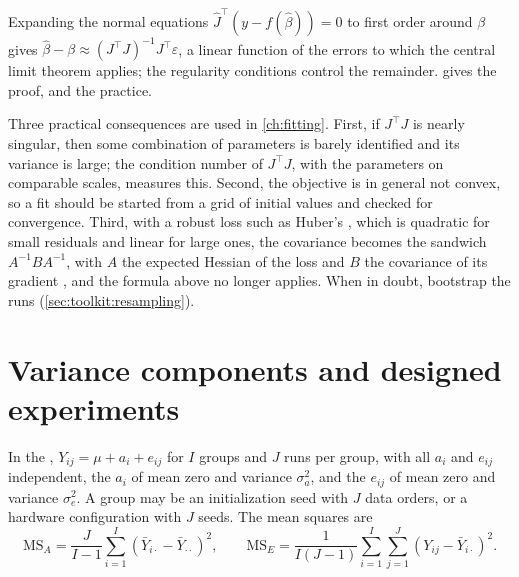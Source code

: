 \begin{refsection}
\begin{proofsketch}
Expanding the normal equations $\hat J^\top(y-f(\hat\beta))=0$ to first order around $\beta$ gives $\hat\beta-\beta\approx(J^\top J)^{-1}J^\top\varepsilon$, a linear function of the errors to which the central limit theorem applies; the regularity conditions control the remainder. \Textcite{Jennrich1969} gives the proof, and \textcite{SeberWild1989} the practice.
\end{proofsketch}

Three practical consequences are used in \cref{ch:fitting}. First, if $J^\top J$ is nearly singular, then some combination of parameters is barely identified and its variance is large; the condition number of $J^\top J$, with the parameters on comparable scales, measures this. Second, the objective is in general not convex, so a fit should be started from a grid of initial values and checked for convergence. Third, with a robust loss such as Huber's \parencite{Huber1964}, which is quadratic for small residuals and linear for large ones, the covariance becomes the sandwich $A^{-1}BA^{-1}$, with $A$ the expected Hessian of the loss and $B$ the covariance of its gradient \parencite[Chapter~5]{vanderVaart1998}, and the formula above no longer applies. When in doubt, bootstrap the runs (\cref{sec:toolkit:resampling}).

\section{Variance components and designed experiments}\label{sec:toolkit:design}

In the , $Y_{ij}=\mu+a_i+e_{ij}$ for $I$ groups and $J$ runs per group, with all $a_i$ and $e_{ij}$ independent, the $a_i$ of mean zero and variance $\sigma_a^2$, and the $e_{ij}$ of mean zero and variance $\sigma_e^2$. A group may be an initialization seed with $J$ data orders, or a hardware configuration with $J$ seeds. The mean squares are
\[
\mathrm{MS}_A=\frac{J}{I-1}\sum_{i=1}^I(\bar Y_{i\cdot}-\bar Y_{\cdot\cdot})^2,\qquad
\mathrm{MS}_E=\frac1{I(J-1)}\sum_{i=1}^I\sum_{j=1}^J(Y_{ij}-\bar Y_{i\cdot})^2.
\]


\end{refsection}
